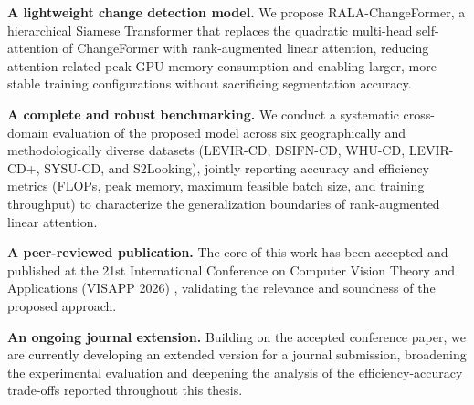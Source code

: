 \noindent\textbf{A lightweight change detection model.} We propose RALA-ChangeFormer, a hierarchical Siamese Transformer that replaces the quadratic multi-head self-attention of ChangeFormer with rank-augmented linear attention, reducing attention-related peak \ac{GPU} memory consumption and enabling larger, more stable training configurations without sacrificing segmentation accuracy.

\noindent\textbf{A complete and robust benchmarking.} We conduct a systematic cross-domain evaluation of the proposed model across six geographically and methodologically diverse datasets (LEVIR-CD, DSIFN-CD, WHU-CD, LEVIR-CD+, SYSU-CD, and S2Looking), jointly reporting accuracy and efficiency metrics (FLOPs, peak memory, maximum feasible batch size, and training throughput) to characterize the generalization boundaries of rank-augmented linear attention.

\noindent\textbf{A peer-reviewed publication.} The core of this work has been accepted and published at the 21st International Conference on Computer Vision Theory and Applications (VISAPP 2026) \cite{acuna2026efficient}, validating the relevance and soundness of the proposed approach.

\noindent\textbf{An ongoing journal extension.} Building on the accepted conference paper, we are currently developing an extended version for a journal submission, broadening the experimental evaluation and deepening the analysis of the efficiency-accuracy trade-offs reported throughout this thesis.